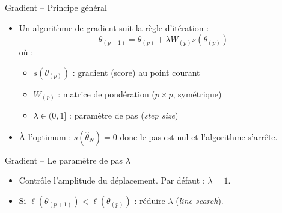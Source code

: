\documentclass[11pt,aspectratio=169]{beamer}
\begin{document}
\begin{frame}{Gradient -- Principe général}

\begin{itemize}

\item Un algorithme de gradient suit la règle d'itération :
  \[
  \boxed{\theta_{(p+1)} = \theta_{(p)} + \lambda W_{(p)} s(\theta_{(p)})}
  \]
  où :
  \begin{itemize}
    \item $s(\theta_{(p)})$ : gradient (score) au point courant\newline
    \item $W_{(p)}$ : matrice de pondération ($p \times p$, symétrique)\newline
    \item $\lambda \in (0, 1]$ : paramètre de pas (\textit{step size})\newline
  \end{itemize}

\item À l'optimum : $s(\hat{\theta}_N) = 0$ donc le pas est nul et l'algorithme s'arrête.

\end{itemize}

\end{frame}

\begin{frame}{Gradient -- Le paramètre de pas $\lambda$}

\begin{itemize}

\item Contrôle l'amplitude du déplacement. Par défaut : $\lambda = 1$.\newline

\item Si $\ell(\theta_{(p+1)}) < \ell(\theta_{(p)})$ : réduire $\lambda$ (\textit{line search}).

\end{itemize}

\vspace{0.3cm}

\begin{center}
\end{center}

\end{frame}
\end{document}
